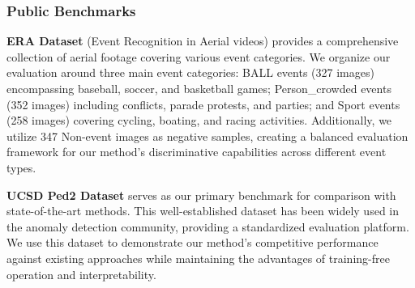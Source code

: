 \subsubsection{Public Benchmarks}
\noindent
\textbf{ERA Dataset} \cite{eradataset} (Event Recognition in Aerial videos) provides a comprehensive collection of aerial footage covering various event categories. We organize our evaluation around three main event categories: BALL events (327 images) encompassing baseball, soccer, and basketball games; Person\_crowded events (352 images) including conflicts, parade protests, and parties; and Sport events (258 images) covering cycling, boating, and racing activities. Additionally, we utilize 347 Non-event images as negative samples, creating a balanced evaluation framework for our method's discriminative capabilities across different event types. \par
% 
\noindent
\textbf{UCSD Ped2 Dataset} \cite{wang2010anomaly} serves as our primary benchmark for comparison with state-of-the-art methods. This well-established dataset has been widely used in the anomaly detection community, providing a standardized evaluation platform. We use this dataset to demonstrate our method's competitive performance against existing approaches while maintaining the advantages of training-free operation and interpretability.

% 
